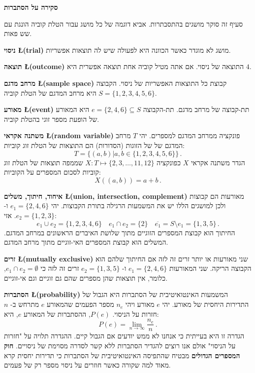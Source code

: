 

\newpage

\begin{center}
\textbf{\LARGE סקירה על הסתברות}
\end{center}

סעיף זה סוקר מושגים בהתסבתרות. אביא דוגמה של כל מושג עבור הטלת קוביה הונגת עם שש פאות. 

\textbf{ניסוי \L{\small (trial)}}
מושג לא מוגדר כאשר הכוונה היא לפעולה שיש לה תוצאות אפשריות.

\textbf{תוצאה \L{\small (outcome)}} 
התוצאה של ניסוי. אם אתה מטיל קוביה אחת תוצאה אפשרית היא 
$4$.

\textbf{מרחב מדגם \L{\small (sample space)}}
קבוצת כל התוצאות האפשריות של ניסוי. הקבוצה 
$S=\{1,2,3,4,5,6\}$
היא מרחב המדגם של הטלת קוביה.

\textbf{מאורע \L{\small (event)}}
תת-קבוצה של מרחב מדגם. תת-הקבוצה 
$e=\{2,4,6\}\subseteq S$
היא המאורע של הופעת מספר זוגי בהטלת קוביה.

\textbf{משתנה אקראי \L{\small (random variable)}}
פונקציה ממרחב המדגם למספרים. יהי 
$T$
מרחב המדגם של של הזוגות (הסדורות) הם התוצאות של הטלת זוג קוביות:
\[
T=\{(a,b)| a,b\in \{1,2,3,4,5,6\} \}\,.
\]
הגדר משתנה אקראי 
$X$
כפונקציה
$X:T \mapsto \{2,3,\ldots,11,12\}$
שממפה תוצאות של הטלת זוג קוביות לסכום המספרים על הקוביות:
\begin{equation}\label{eq.sum}
X((a,b)) = a+b\,.
\end{equation}

\textbf{איחוד, חיתוך, משלים \L{\small (union, intersection, complement)}} 
מאורעות הם קבוצות ולכן למושגים הללו יש את המשמעות הרגילה בתורת הקבוצות. יהי
$e_1=\{2,4,6\}$
ו-%
$e_2=\{1,2,3\}$. 
אזי:
\[
e_1 \cup e_2=\{1,2,3,4,6\}\quad e_1 \cap e_2=\{2\}\quad \overline{e_1} = S\setminus e_1=\{1,3,5\}\,.
\]
החיתוך הוא קבוצת המספרים הזוגיים מתוך שלושת האיברים הראשונים במרחב המדגם. המשלים הוא קבוצת המספרים האי-זוגיים מתוך מרחב המדגם.

\textbf{זרים \L{\small (mutually exclusive)}} 
שני מאורעות או יותר זרים זה לזה אם החיתוך שלהם הוא הקבוצה הריקה. שני המאורעות
$e_1=\{2,4,6\}$
ו-%
$e_2=\{1,3,5\}$
זרים זה לזה כי
$e_1 \cap e_2=\emptyset$,
כלומר, אין תוצאות שהן מספרים שהם גם זוגיים וגם אי-זוגיים.

\textbf{הסתברות \L{\small (probability)}}
המשמעות האינטואיטיבית של הסתברות היא הגבול של התדירות היחסית של מאורע. יהי
$e$ 
מאורע ויהי
$n_e$
מספר הפעמים שהמאורע 
$e$
מתרחש ב-%
$n$
חזרות על הניסוי. 
$P(e)$,
ההסתברות של המאורע
$e$,
היא:
\[
P(e) = \lim_{n\rightarrow \infty} \frac{n_e}{n}\,.
\]
הגדרה זו היא בעייתית כי אנחנו לא ממש יודעים אם הגבול קיים. ההגדרה תלויה על "חזרות על הניסוי" אולם אנו רוצים להגדיר הסתברות ללא קשר לסדרה מסוימת של ניסויים. 
\textbf{חוק המספרים הגדולים}
מבטיח שהתפיסה האינטואיטיבית של הסתברות כי תדירות יחסית קרא מאוד למה שקורה כאשר חוזרים על ניסוי מספר רק של פעמים.

